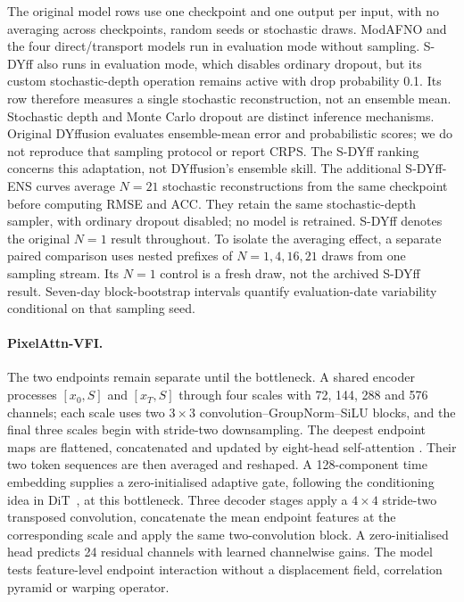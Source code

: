 \documentclass[referee,lineno,pdflatex,sn-nature]{sn-jnl}
\begin{document}
\begin{deferredmethodsintro}
The original model rows use one checkpoint and one output per input, with
no averaging across checkpoints, random seeds or stochastic draws. ModAFNO
and the four direct/transport models run in evaluation mode without sampling.
S-DYff also runs in evaluation mode, which disables ordinary dropout, but its
custom stochastic-depth operation remains active with drop probability 0.1.
Its row therefore measures a single stochastic reconstruction, not an
ensemble mean. Stochastic depth \cite{huang2016stochastic} and Monte Carlo
dropout \cite{gal2016dropout} are distinct inference mechanisms. Original
DYffusion evaluates ensemble-mean error and probabilistic scores; we do not
reproduce that sampling protocol or report CRPS. The S-DYff ranking concerns
this adaptation, not DYffusion's ensemble skill.
The additional S-DYff-ENS curves average $N=21$ stochastic reconstructions
from the same checkpoint before computing RMSE and ACC. They retain the
same stochastic-depth sampler, with ordinary dropout disabled; no model is
retrained. S-DYff denotes the original $N=1$ result throughout.
To isolate the averaging effect, a separate paired comparison uses nested
prefixes of $N=1,4,16,21$ draws from one sampling stream. Its $N=1$ control
is a fresh draw, not the archived S-DYff result. Seven-day block-bootstrap
intervals quantify evaluation-date variability conditional on that sampling
seed.

\paragraph{PixelAttn-VFI.}
The two endpoints remain separate until the bottleneck. A shared encoder
processes $[x_0,S]$ and $[x_T,S]$ through four scales with 72, 144, 288 and
576 channels; each scale uses two $3\times3$ convolution--GroupNorm--SiLU
blocks, and the final three scales begin with stride-two downsampling. The
deepest endpoint maps are flattened, concatenated and updated by eight-head
self-attention \cite{vaswani2017attention}. Their two token sequences are
then averaged and reshaped. A
128-component time embedding supplies a zero-initialised adaptive gate,
following the conditioning idea in DiT~\cite{peebles2023dit}, at this
bottleneck. Three decoder stages apply a $4\times4$ stride-two transposed
convolution, concatenate the mean endpoint features at the corresponding
scale and apply the same two-convolution block. A zero-initialised head
predicts 24 residual channels with learned channelwise gains. The model tests
feature-level endpoint interaction without a displacement field, correlation
pyramid or warping operator.


\end{deferredmethodsintro}
\end{document}
